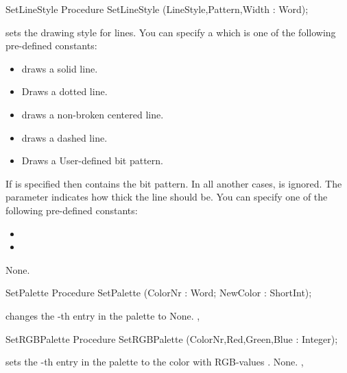 \begin{procedure}{SetLineStyle}
\Declaration
Procedure SetLineStyle (LineStyle,Pattern,Width :
Word);

\Description
{}
sets the drawing style for lines. You can specify a  which is
one of the following pre-defined constants:
\begin{itemize}
\item {} draws a solid line.
\item {} Draws a dotted line.
\item {} draws a non-broken centered line.
\item {} draws a dashed line.
\item {} Draws a User-defined bit pattern.
\end{itemize}
If  is specified then  contains the bit pattern.
In all another cases,  is ignored. The parameter  
indicates how thick the line should be. You can specify one of the following
pre-defined constants:
\begin{itemize}
\item {}
\item {}
\end{itemize}

\Errors
None.
\SeeAlso
{}
\end{procedure}
\begin{procedure}{SetPalette}
\Declaration
Procedure SetPalette (ColorNr : Word; NewColor : ShortInt);

\Description
{} changes the -th entry in the palette to
\Errors
None.
\SeeAlso
{},
\end{procedure}
\begin{procedure}{SetRGBPalette}
\Declaration
Procedure SetRGBPalette (ColorNr,Red,Green,Blue : Integer);

\Description
{} sets the -th entry in the palette to the
color with RGB-values .
\Errors
None.
\SeeAlso
{},
\end{procedure}

